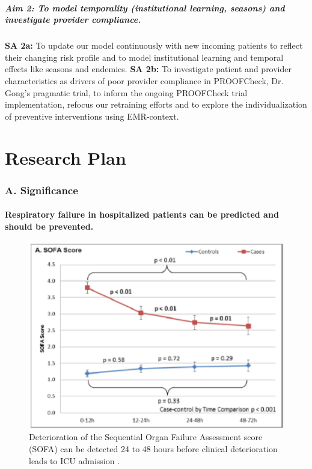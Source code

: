 \documentclass[11pt,notitlepage]{article}
\begin{document}
\subsubsection*{Aim 2: To model temporality (institutional learning, seasons) and investigate provider compliance.}
\textbf{SA 2a:} To update our model continuously with new incoming patients to reflect their changing risk profile and to model institutional learning and temporal effects like seasons and endemics. 
\newline \textbf{SA 2b:} To investigate patient and provider characteristics as drivers of poor provider compliance in PROOFCheck, Dr. Gong's pragmatic trial, to inform the ongoing PROOFCheck trial implementation, refocus our retraining efforts and to explore the individualization of preventive interventions using EMR-context. 
\newpage
\part*{Research Plan}

\section*{A. Significance}

\subsection*{Respiratory failure in hospitalized patients can be predicted and should be prevented.} 

\begin{figure}
 \vspace{-70pt}
 \includegraphics[scale=0.7]{Figures/SOFA_fig.png}
  \vspace{-30pt}
  \caption{\footnotesize Deterioration of the Sequential Organ Failure Assessment score (SOFA) can be detected 24 to 48 hours before clinical deterioration leads to ICU admission \cite{Yu_24970344}.}
    \label{fig:SOFA_fig}
 \vspace{-20pt}
\end{figure}
\end{document}
